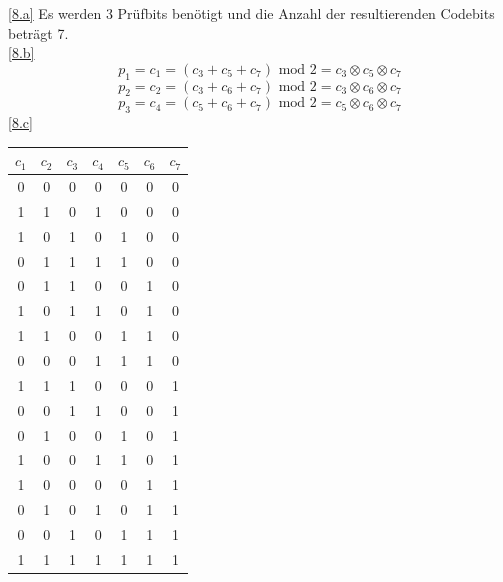 \documentclass[a4paper, margins=2cm]{homework}
\begin{document}
\begin{solution}
	\ref{8.a}
	Es werden 3 Prüfbits benötigt und die Anzahl der resultierenden Codebits beträgt 7. \\

	\ref{8.b}
	\[p_1 = c_1 = (c_3+c_5+c_7) \text{ mod } 2 = c_3 \otimes c_5 \otimes c_7\]
	\[p_2 = c_2 = (c_3+c_6+c_7) \text{ mod } 2 = c_3 \otimes c_6 \otimes c_7\]
	\[p_3 = c_4 = (c_5+c_6+c_7) \text{ mod } 2 = c_5 \otimes c_6 \otimes c_7\]
\newpage
	\ref{8.c}
	\begin{center}
		\begin{tabular}{|c|c|c|c|c|c|c|}
			\hline
			$c_1$ & $c_2$ & $c_3$ & $c_4$ & $c_5$ & $c_6$ & $c_7$ \\ \hline
			0     & 0     & 0     & 0     & 0     & 0     & 0     \\ \hline
			1     & 1     & 0     & 1     & 0     & 0     & 0     \\ \hline
			1     & 0     & 1     & 0     & 1     & 0     & 0     \\ \hline
			0     & 1     & 1     & 1     & 1     & 0     & 0     \\ \hline
			0     & 1     & 1     & 0     & 0     & 1     & 0     \\ \hline
			1     & 0     & 1     & 1     & 0     & 1     & 0     \\ \hline
			1     & 1     & 0     & 0     & 1     & 1     & 0     \\ \hline
			0     & 0     & 0     & 1     & 1     & 1     & 0     \\ \hline
			1     & 1     & 1     & 0     & 0     & 0     & 1     \\ \hline
			0     & 0     & 1     & 1     & 0     & 0     & 1     \\ \hline
			0     & 1     & 0     & 0     & 1     & 0     & 1     \\ \hline
			1     & 0     & 0     & 1     & 1     & 0     & 1     \\ \hline
			1     & 0     & 0     & 0     & 0     & 1     & 1     \\ \hline
			0     & 1     & 0     & 1     & 0     & 1     & 1     \\ \hline
			0     & 0     & 1     & 0     & 1     & 1     & 1     \\ \hline
			1     & 1     & 1     & 1     & 1     & 1     & 1     \\ \hline
		\end{tabular}
	\end{center}


\end{solution}
\end{document}
